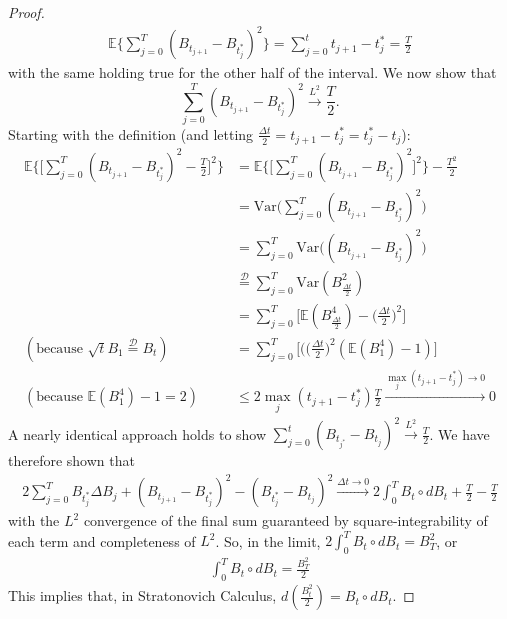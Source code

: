 \documentclass[11pt]{article}
\newcommand{\var}{\mrm{Var}}
\newcommand{\Gd}{\Delta}
\newcommand{\mrm}{\mathrm}
\renewcommand{\to}{\longrightarrow}
\newcommand{\eqd}{\overset{\mathcal{D}}{=}}
\newcommand{\E}{\mathbb{E}}
\begin{document}
\begin{proof}
\begin{align*}
\E \Big\{ \sum_{j=0}^T  (B_{t_{j+1}}-B_{t_j^*})^2 \Big\} = \sum_{j=0}^t t_{j+1}-t_j^* = \frac{T}{2}
\end{align*}
with the same holding true for the other half of the interval.  We now show that 
$$\sum_{j=0}^T (B_{t_{j+1}}-B_{t_j^*})^2 \xrightarrow{L^2} \frac{T}{2}.$$
Starting with the definition (and letting $\frac{\Gd t}{2}= t_{j+1}-t_j^*=t_j^*-t_j$): 
\begin{align*}
\E \Big\{ \Big[ \sum_{j=0}^T  (B_{t_{j+1}}-B_{t_j^*})^2 -\frac{T}{2} \Big]^2 \Big\} & = \E \Big\{ \Big[ \sum_{j=0}^T   (B_{t_{j+1}}-B_{t_j^*})^2 \Big]^2 \Big\} - \frac{T^2}{2}\\
&= \var \Big( \sum_{j=0}^T  (B_{t_{j+1}}-B_{t_j^*})^2\Big)\\
&=\sum_{j=0}^T \var \Big((B_{t_{j+1}}-B_{t_j^*})^2\Big)\\
&\eqd \sum_{j=0}^T \var (B_{\frac{\Gd t}{2}}^2) \\
&= \sum_{j=0}^T\Big[ \E (B_{\frac{\Gd t}{2}}^4)-\Big(\frac{\Gd t}{2}\Big)^2 \Big]\\
(\text{because }\sqrt{t}B_1\eqd B_t )&= \sum_{j=0}^T \Big[ (\Big(\frac{\Gd t}{2}\Big)^2 (\E(B_1^4)-1)  \Big] \\
(\text{because }\E(B_1^4)-1=2)& \leq 2 \max_j(t_{j+1}-t_j^*) \frac{T}{2} \xrightarrow{ \max_j(t_{j+1}-t_j^*)  \to 0} 0
\end{align*}
A nearly identical approach holds to show $\sum_{j=0}^t (B_{t_{j^*}}-B_{t_j})^2 \xrightarrow{L^2} \frac{T}{2}$.  We have therefore shown that
\begin{align*}
2\sum_{j=0}^T B_{t_j^*} \Gd B_j +(B_{t_{j+1}}-B_{t_j^*})^2-(B_{t_j^*}-B_{t_j})^2 \xrightarrow{\Gd t \to 0} 2 \int _ { 0 } ^ { T } B _ { t } \circ d B _ { t } +\frac{T}{2}-\frac{T}{2}
\end{align*}
with the $L^2$ convergence of the final sum guaranteed by square-integrability of each term and completeness of $L^2$.  So, in the limit, $ 2 \int _ { 0 } ^ { T } B _ { t } \circ d B _ { t }=B_T^2$, or
\begin{align*}
\int _ { 0 } ^ { T } B _ { t } \circ d B _ { t } = \frac{B_T^2}{2}
\end{align*}
This implies that, in Stratonovich Calculus, $d (\frac{B_t^2}{2}) = B_t \circ dB_t$.
\end{proof}
\end{document}
